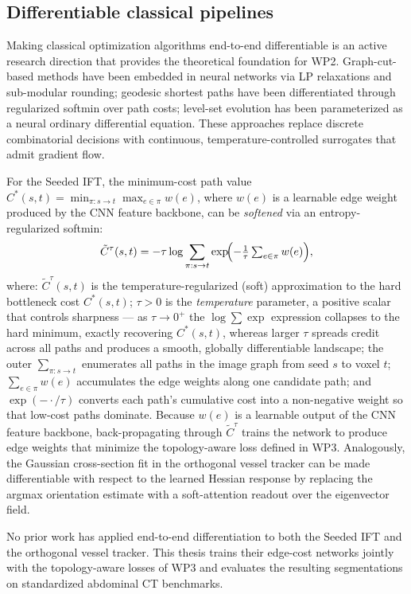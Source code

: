 \documentclass[a4paper,11pt,twoside]{article}
\begin{document}
\subsection{Differentiable classical pipelines}

Making classical optimization algorithms end-to-end differentiable is an
active research direction that provides the theoretical foundation for WP2.
Graph-cut-based methods have been embedded in neural networks via LP
relaxations and sub-modular rounding; geodesic shortest paths have been
differentiated through regularized softmin over path costs; level-set
evolution has been parameterized as a neural ordinary differential equation.
These approaches replace discrete combinatorial decisions with continuous,
temperature-controlled surrogates that admit gradient flow.

For the Seeded IFT, the minimum-cost path value
$C^*(s,t) = \min_{\pi: s\to t} \max_{e\in\pi} w(e)$, where $w(e)$ is a
learnable edge weight produced by the CNN feature backbone, can be
\emph{softened} via an entropy-regularized softmin:
\[
  \tilde{C}^\tau(s,t)
  = -\tau \log \sum_{\pi: s\to t}
    \exp\!\Bigl(-\tfrac{1}{\tau}\textstyle\sum_{e\in\pi} w(e)\Bigr),
\]
where: $\tilde{C}^\tau(s,t)$ is the temperature-regularized (soft)
approximation to the hard bottleneck cost $C^*(s,t)$; $\tau > 0$ is the
\emph{temperature} parameter, a positive scalar that controls sharpness ---
as $\tau \to 0^+$ the $\log\!\sum\!\exp$ expression collapses to the hard
minimum, exactly recovering $C^*(s,t)$, whereas larger $\tau$ spreads
credit across all paths and produces a smooth, globally differentiable
landscape; the outer $\sum_{\pi: s\to t}$ enumerates all paths in the image
graph from seed $s$ to voxel $t$; $\sum_{e\in\pi} w(e)$ accumulates the edge
weights along one candidate path; and $\exp(-\cdot/\tau)$ converts each
path's cumulative cost into a non-negative weight so that low-cost paths
dominate.  Because $w(e)$ is a learnable output of the CNN feature backbone,
back-propagating through $\tilde{C}^\tau$ trains the network to produce edge
weights that minimize the topology-aware loss defined in WP3.  Analogously,
the Gaussian cross-section fit in the orthogonal vessel tracker can be made
differentiable with respect to the learned Hessian response by replacing the
argmax orientation estimate with a soft-attention readout over the
eigenvector field.

No prior work has applied end-to-end
differentiation to both the Seeded IFT and the orthogonal vessel tracker.
This thesis trains their edge-cost networks jointly with the topology-aware
losses of WP3 and evaluates the resulting segmentations on standardized
abdominal CT benchmarks.
\end{document}
